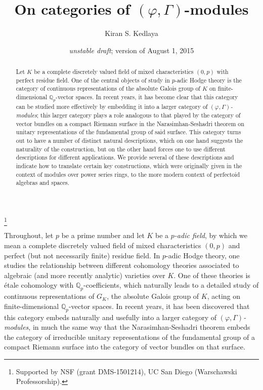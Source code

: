\documentclass[12pt]{amsart}
\theoremstyle{definition}
\numberwithin{equation}{theorem}
\newcommand{\QQ}{\mathbb{Q}}
\begin{document}
\title{On categories of $(\varphi, \Gamma)$-modules}
\author{Kiran S. Kedlaya}
\thanks{Supported by NSF (grant DMS-1501214), UC San Diego (Warschawski Professorship).}
\date{\textit{unstable draft}; version of August 1, 2015}

\begin{abstract}
Let $K$ be a complete discretely valued field of mixed characteristics $(0,p)$ with perfect residue field. One of the central objects of study in $p$-adic Hodge theory is the cate\-gory of continuous representations of the absolute Galois group of $K$ on finite-dimensional $\QQ_p$-vector spaces. In recent years, it has become clear that this category can be studied more effectively by embedding it into a larger category of \emph{$(\varphi, \Gamma)$-modules}; this larger category plays a role analogous to that played by the category of vector bundles on a compact Riemann surface in the Narasimhan-Seshadri theorem on unitary representations of the fundamental group of said surface. This category turns out to have a number of distinct natural descriptions, which on one hand suggests the naturality of the construction, but on the other hand forces one to use different descriptions for different applications. We provide several of these descriptions and indicate how to translate certain key constructions, which were originally given in the context of modules over power series rings, to the more modern context of perfectoid algebras and spaces.
\end{abstract}

\maketitle

Throughout, let $p$ be a prime number and let $K$ be a \emph{$p$-adic field}, by which we mean a complete discretely valued field of mixed characteristics $(0,p)$ and perfect (but not necessarily finite) residue field. In $p$-adic Hodge theory, one studies the relationship between different cohomology theories associated to algebraic (and more recently analytic) varieties over $K$. One of these theories is \'etale cohomology with $\QQ_p$-coefficients, which naturally leads to a detailed study of continuous representations of $G_K$, the absolute Galois group of $K$, acting on finite-dimensional $\QQ_p$-vector spaces. In recent years, it has been discovered that this category embeds naturally and usefully into a larger category of \emph{$(\varphi, \Gamma)$-modules}, in much the same way that the Narasimhan-Seshadri theorem embeds the category of irreducible unitary representations of the fundamental group of a compact Riemann surface into the category of vector bundles on that surface.
\end{document}
